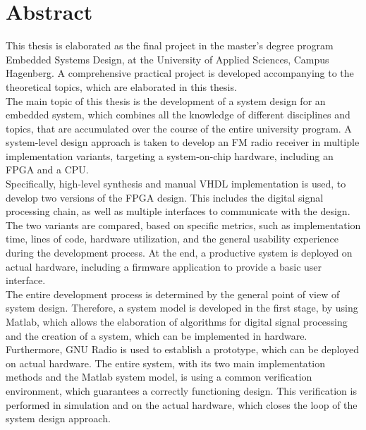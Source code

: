 \chapter{Abstract}


This thesis is elaborated as the final project in the master's degree program Embedded Systems Design, at the University of Applied Sciences, Campus Hagenberg.
A comprehensive practical project is developed accompanying to the theoretical topics, which are elaborated in this thesis.\\

The main topic of this thesis is the development of a system design for an embedded system, which combines all the knowledge of different disciplines and topics, that are accumulated over the course of the entire university program.
A system-level design approach is taken to develop an FM radio receiver in multiple implementation variants, targeting a system-on-chip hardware, including an FPGA and a CPU.\\

Specifically, high-level synthesis and manual VHDL implementation is used, to develop two versions of the FPGA design.
This includes the digital signal processing chain, as well as multiple interfaces to communicate with the design.
The two variants are compared, based on specific metrics, such as implementation time, lines of code, hardware utilization, and the general usability experience during the development process.
At the end, a productive system is deployed on actual hardware, including a firmware application to provide a basic user interface.\\

The entire development process is determined by the general point of view of system design.
Therefore, a system model is developed in the first stage, by using Matlab, which allows the elaboration of algorithms for digital signal processing and the creation of a system, which can be implemented in hardware.
Furthermore, GNU Radio is used to establish a prototype, which can be deployed on actual hardware.
The entire system, with its two main implementation methods and the Matlab system model, is using a common verification environment, which guarantees a correctly functioning design.
This verification is performed in simulation and on the actual hardware, which closes the loop of the system design approach.

